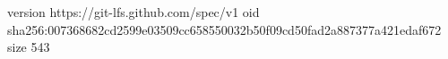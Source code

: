 version https://git-lfs.github.com/spec/v1
oid sha256:007368682cd2599e03509cc658550032b50f09cd50fad2a887377a421edaf672
size 543
